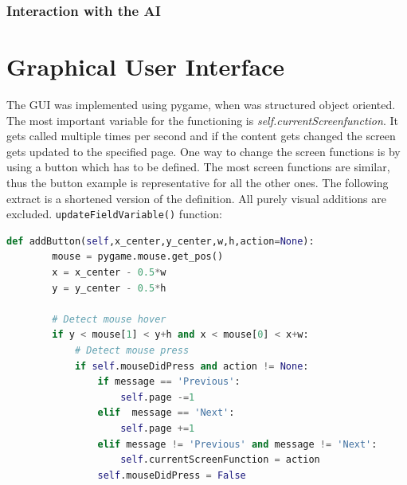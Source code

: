 \documentclass[12pt]{article}
\begin{document}
\subsubsection{Interaction with the AI}
\section{Graphical User Interface}
The GUI was implemented using pygame, when was structured object oriented. The most important variable for the functioning is \textit{self.currentScreenfunction}. It gets called multiple times per second and if the content gets changed the screen gets updated to the specified page. One way to change the screen functions is by using a button which has to be defined. The most screen functions are similar, thus the button example is representative for all the other ones. The following extract is a shortened version of the definition. All purely visual additions are excluded.
\lstinline{updateFieldVariable()} function:
\begin{lstlisting}[language=Python, caption=Example - Definition of the button function]
    def addButton(self,x_center,y_center,w,h,action=None):
        mouse = pygame.mouse.get_pos()
        x = x_center - 0.5*w
        y = y_center - 0.5*h

        # Detect mouse hover
        if y < mouse[1] < y+h and x < mouse[0] < x+w:
            # Detect mouse press
            if self.mouseDidPress and action != None:
                if message == 'Previous': 
                    self.page -=1
                elif  message == 'Next':
                    self.page +=1
                elif message != 'Previous' and message != 'Next':
                    self.currentScreenFunction = action
                self.mouseDidPress = False
\end{lstlisting}
\end{document}
